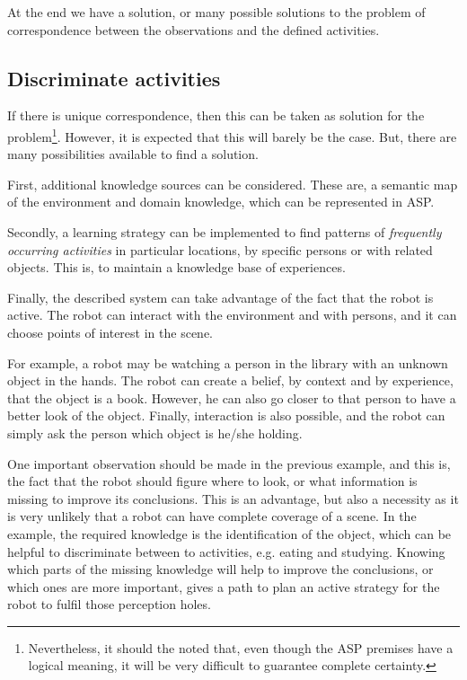At the end we have a solution, or many possible solutions to the problem of correspondence between the observations and the defined activities.



\subsection{Discriminate activities}

If there is unique correspondence, then this can be taken as solution for the problem\footnote{Nevertheless, it should the noted that, even though the ASP premises have a logical meaning, it will be very difficult to guarantee complete certainty.}. 
However, it is expected that this will barely be the case.
But, there are many possibilities available to find a solution.

First, additional knowledge sources can be considered.
These are, a semantic map of the environment and domain knowledge, which can be represented in ASP.

Secondly, a learning strategy can be implemented to find patterns of \textit{frequently occurring activities} in particular locations, by specific persons or with related objects. 
This is, to maintain a knowledge base of experiences.

Finally, the described system can take advantage of the fact that the robot is active.
The robot can interact with the environment and with persons, and it can choose points of interest in the scene.

For example, a robot may be watching a person in the library with an unknown object in the hands. 
The robot can create a belief, by context and by experience, that the object is a book.
However, he can also go closer to that person to have a better look of the object.
Finally, interaction is also possible, and the robot can simply ask the person which object is he/she holding.

One important observation should be made in the previous example, and this is, the fact that the robot should figure where to look, or what information is missing to improve its conclusions. 
This is an advantage, but also a necessity as it is very unlikely that a robot can have complete coverage of a scene.
In the example, the required knowledge is the identification of the object, which can be helpful to discriminate between to activities, e.g. eating and studying. 
Knowing which parts of the missing knowledge will help to improve the conclusions, or which ones are more important, gives a path to plan an active strategy for the robot to fulfil those perception holes.

